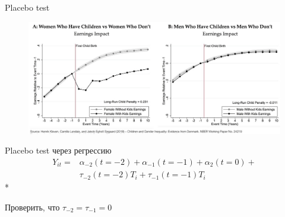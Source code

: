 
\begin{frame}{Placebo test}
\begin{figure}
    \centering
    \includegraphics[width=\textwidth]{Images/gender.jpg}
    \label{fig:my_label}
\end{figure}
\end{frame}

\begin{frame}{Placebo test через регрессию}
\begin{align*}
    Y_{it} = & \alpha_{-2} (t=-2) + \alpha_{-1}  (t=-1) + \alpha_2 (t=0) + \\
    & \tau_{-2} (t=-2) T_{i} + \tau_{-1} (t=-1) T_{i}
\end{align*}*

Проверить, что $\tau_{-2} = \tau_{-1} = 0$

\end{frame}






